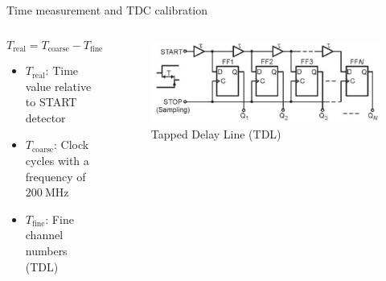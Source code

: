 \documentclass{ikpKoeln}
\begin{document}
\begin{frame}[t]{Time measurement and TDC calibration}
\begin{columns}[c]
\begin{column}{0.45 \textwidth}
			\vspace{-0.5em}
			$$T_\text{real} = T_\text{coarse} - T_\text{fine}$$
			\vspace{-1em}
			\small
			{
				\begin{itemize}
					\item $T_\text{real}$: Time value relative to START detector
					\item $T_\text{coarse}$: Clock cycles with a frequency of $\qty{200}{\MHz}$
					\item $T_\text{fine}$: Fine channel numbers (TDL)
				\end{itemize}
			}
		\end{column}
		\begin{column}{0.5 \textwidth}
			\begin{figure}
				\vspace{-0.8em}\includegraphics[width = \textwidth]{r3b/TDCFineTime}
				\caption*{Tapped Delay Line (TDL)}
			\end{figure}
			\vspace{-2.3em}
		\end{column}
	\end{columns}
\end{frame}
\end{document}
